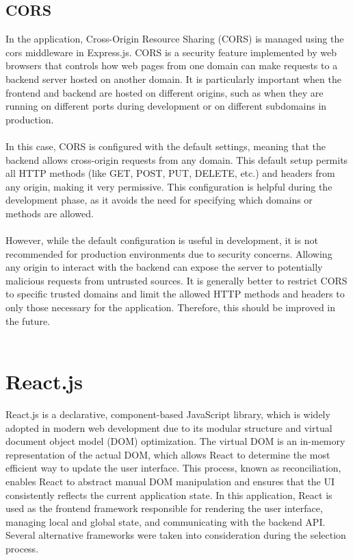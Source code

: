 \documentclass[a4paper,12pt]{report}
\begin{document}
\subsection{CORS}
In the application, Cross-Origin Resource Sharing (CORS) is managed using the cors middleware in Express.js. CORS is a security feature implemented by web browsers that controls how web pages from one domain can make requests to a backend server hosted on another domain. It is particularly important when the frontend and backend are hosted on different origins, such as when they are running on different ports during development or on different subdomains in production. \\ \\
In this case, CORS is configured with the default settings, meaning that the backend allows cross-origin requests from any domain. This default setup permits all HTTP methods (like GET, POST, PUT, DELETE, etc.) and headers from any origin, making it very permissive. This configuration is helpful during the development phase, as it avoids the need for specifying which domains or methods are allowed. \\ \\
However, while the default configuration is useful in development, it is not recommended for production environments due to security concerns. Allowing any origin to interact with the backend can expose the server to potentially malicious requests from untrusted sources. It is generally better to restrict CORS to specific trusted domains and limit the allowed HTTP methods and headers to only those necessary for the application. Therefore, this should be improved in the future. \cite{mdn-cors} \\ \\

\section{React.js}
React.js is a declarative, component-based JavaScript library, which is widely adopted in modern web development due to its modular structure and virtual document object model (DOM) optimization. The virtual DOM is an in-memory representation of the actual DOM, which allows React to determine the most efficient way to update the user interface. This process, known as reconciliation, enables React to abstract manual DOM manipulation and ensures that the UI consistently reflects the current application state. In this application, React is used as the frontend framework responsible for rendering the user interface, managing local and global state, and communicating with the backend API. Several alternative frameworks were taken into consideration during the selection process. \cite{react-docs} \cite{virtual-DOM}
\end{document}
